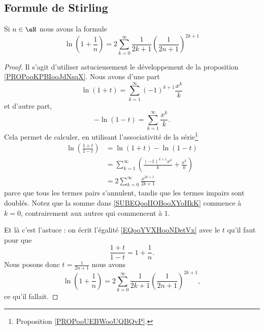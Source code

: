 \subsection{Formule de Stirling}

\begin{lemma}     \label{LEMooDXJOooOGFcIv}
	Si \( n\in \eN\) nous avons la formule
	\begin{equation}
		\ln(1+\frac{1}{ n })=2\sum_{k=0}^{\infty} \frac{1}{ 2k+1 } \left( \frac{1}{ 2n+1 } \right)^{2k+1}
	\end{equation}
\end{lemma}

\begin{proof}
	Il s'agit d'utiliser astucieusement le développement de la proposition \ref{PROPooKPBIooJdNsqX}. Nous avons d'une part
	\begin{equation}
		\ln(1+t)=\sum_{k=1}^{\infty}(-1)^{k+1}\frac{ x^k }{ k }
	\end{equation}
	et d'autre part,
	\begin{equation}
		-\ln(1-t)=\sum_{k=1}^{\infty}\frac{ x^k }{ k }.
	\end{equation}
	Cela permet de calculer, en utilisant l'associativité de la série\footnote{Proposition \ref{PROPooUEBWooUQBQvP}.}
	\begin{subequations}\label{EQooYVXHooNDetVx}
		\begin{align}
			\ln\left( \frac{ 1+t }{ 1-t } \right) & =\ln(1+t)-\ln(1-t)                                                               \\
			                                      & =\sum_{k=1}^{\infty}\left( \frac{ (-1)^{k+1}x^k }{ k }+\frac{ x^k }{ k } \right) \\
			                                      & =2\sum_{k=0}^{\infty}\frac{ x^{2k+1} }{ 2k+1 }     \label{SUBEQooIIOBooXYoHkK}
		\end{align}
	\end{subequations}
	parce que tous les termes pairs s'annulent, tandis que les termes impairs sont doublés. Notez que la somme dans \eqref{SUBEQooIIOBooXYoHkK} commence à \( k=0\), contrairement aux autres qui commencent à \( 1\).

	Et là c'est l'astuce : on écrit l'égalité \eqref{EQooYVXHooNDetVx} avec le \( t\) qu'il faut pour que
	\begin{equation}
		\frac{ 1+t }{ 1-t }=1+\frac{1}{ n }.
	\end{equation}
	Nous posons donc \( t=\frac{1}{ 2n+1 }\) nous avons
	\begin{equation}
		\ln\left( 1+\frac{1}{ n } \right)=2\sum_{k=0}^{\infty}  \frac{1}{ 2k+1 } \left( \frac{1}{ 2n+1 } \right)^{2k+1},
	\end{equation}
	ce qu'il fallait.
\end{proof}


